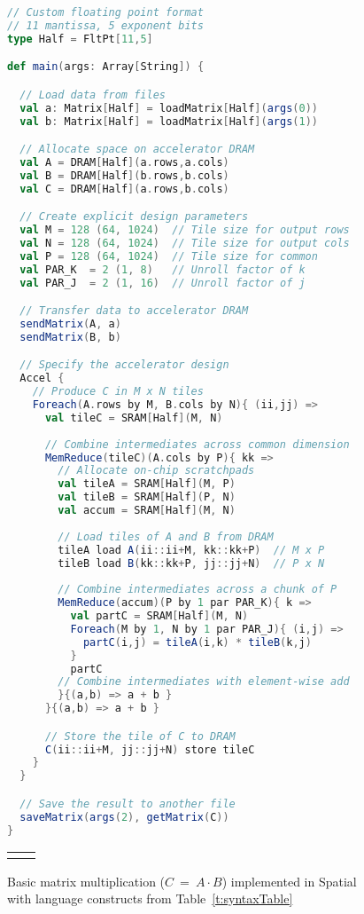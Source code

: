 \begin{figure}
\centering

\newsavebox{\gemm}
\begin{lrbox}{\gemm}
\begin{lstlisting}[language=scala,linewidth=0.91\columnwidth]
// Custom floating point format
// 11 mantissa, 5 exponent bits
type Half = FltPt[11,5]

def main(args: Array[String]) {

  // Load data from files
  val a: Matrix[Half] = loadMatrix[Half](args(0))
  val b: Matrix[Half] = loadMatrix[Half](args(1))

  // Allocate space on accelerator DRAM
  val A = DRAM[Half](a.rows,a.cols)
  val B = DRAM[Half](b.rows,b.cols)
  val C = DRAM[Half](a.rows,b.cols)

  // Create explicit design parameters
  val M = 128 (64, 1024)  // Tile size for output rows
  val N = 128 (64, 1024)  // Tile size for output cols
  val P = 128 (64, 1024)  // Tile size for common
  val PAR_K  = 2 (1, 8)   // Unroll factor of k 
  val PAR_J  = 2 (1, 16)  // Unroll factor of j

  // Transfer data to accelerator DRAM
  sendMatrix(A, a)
  sendMatrix(B, b)

  // Specify the accelerator design
  Accel {
    // Produce C in M x N tiles
    Foreach(A.rows by M, B.cols by N){ (ii,jj) =>
      val tileC = SRAM[Half](M, N)
      
      // Combine intermediates across common dimension
      MemReduce(tileC)(A.cols by P){ kk =>
        // Allocate on-chip scratchpads
        val tileA = SRAM[Half](M, P) 
        val tileB = SRAM[Half](P, N)
        val accum = SRAM[Half](M, N)
          
        // Load tiles of A and B from DRAM
        tileA load A(ii::ii+M, kk::kk+P)  // M x P
        tileB load B(kk::kk+P, jj::jj+N)  // P x N
        
        // Combine intermediates across a chunk of P
        MemReduce(accum)(P by 1 par PAR_K){ k =>
          val partC = SRAM[Half](M, N)
          Foreach(M by 1, N by 1 par PAR_J){ (i,j) =>
            partC(i,j) = tileA(i,k) * tileB(k,j)
          }
          partC
        // Combine intermediates with element-wise add
        }{(a,b) => a + b }
      }{(a,b) => a + b }

      // Store the tile of C to DRAM
      C(ii::ii+M, jj::jj+N) store tileC
    }
  }

  // Save the result to another file
  saveMatrix(args(2), getMatrix(C))
}
\end{lstlisting}
\end{lrbox}

\begin{tabular}{m{0.01cm} l} & \usebox{\gemm} \end{tabular}
\caption{Basic matrix multiplication ($C$~=~$A\cdot B$) implemented in Spatial with language
constructs from Table~\ref{t:syntaxTable}
\vspace{-10pt}}
\label{fig:matmult}
\end{figure}  
